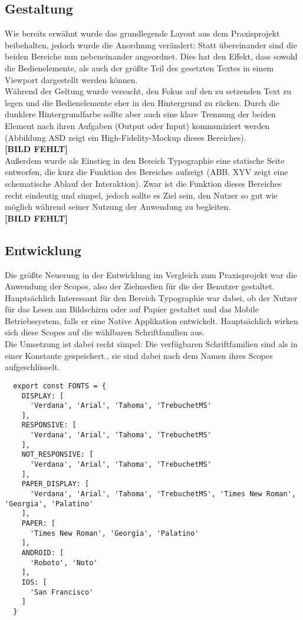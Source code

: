 \subsection{Gestaltung}
Wie bereits erwähnt wurde das grundlegende Layout aus dem Praxisprojekt beibehalten, jedoch wurde die Anordnung verändert: Statt übereinander sind die beiden Bereiche nun nebeneinander angeordnet. Dies hat den Effekt, dass sowohl die Bedienelemente, als auch der größte Teil des gesetzten Textes in einem Viewport dargestellt werden können.\\
Während der Geltung wurde versucht, den Fokus auf den zu setzenden Text zu legen und die Bedienelemente eher in den Hintergrund zu rücken. Durch die dunklere Hintergrundfarbe sollte aber auch eine klare Trennung der beiden Element nach ihren Aufgaben (Output oder Input) kommuniziert werden (Abbildung ASD zeigt ein High-Fidelity-Mockup dieses Bereiches).\\
\textbf{[BILD FEHLT]}\\
Außerdem wurde als Einstieg in den Bereich Typographie eine statische Seite entworfen, die kurz die Funktion des Bereiches aufzeigt (ABB. XYV zeigt eine schematische Ablauf der Interaktion). Zwar ist die Funktion dieses Bereiches recht eindeutig und simpel,  jedoch sollte es Ziel sein, den Nutzer so gut wie möglich während seiner Nutzung der Anwendung zu begleiten.\\
\textbf{[BILD FEHLT]}

\subsection{Entwicklung}
Die größte Neuerung in der Entwicklung im Vergleich zum Praxisprojekt war die Anwendung der Scopes, also der Zielmedien für die der Benutzer gestaltet. Hauptsächlich Interessant für den Bereich Typographie war dabei, ob der Nutzer für das Lesen am Bildschirm oder auf Papier gestaltet und das Mobile Betriebssystem, falls er eine Native Applikation entwickelt. Hauptsächlich wirken sich diese Scopes auf die wählbaren Schriftfamilien aus.\\

Die Umsetzung ist dabei recht simpel: Die verfügbaren Schriftfamilien sind als in einer Konstante gespeichert., sie sind dabei nach dem Namen ihres Scopes aufgeschlüsselt.

\begin{lstlisting}
  export const FONTS = {
    DISPLAY: [
      'Verdana', 'Arial', 'Tahoma', 'TrebuchetMS'
    ],
    RESPONSIVE: [
      'Verdana', 'Arial', 'Tahoma', 'TrebuchetMS'
    ],
    NOT_RESPONSIVE: [
      'Verdana', 'Arial', 'Tahoma', 'TrebuchetMS'
    ],
    PAPER_DISPLAY: [
      'Verdana', 'Arial', 'Tahoma', 'TrebuchetMS', 'Times New Roman', 'Georgia', 'Palatino'
    ],
    PAPER: [
      'Times New Roman', 'Georgia', 'Palatino'
    ],
    ANDROID: [
      'Roboto', 'Noto'
    ],
    IOS: [
      'San Francisco'
    ]
  }
\end{lstlisting}

